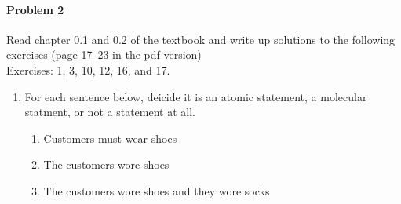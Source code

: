 \documentclass[11pt, a4paper]{article}
\begin{document}
\paragraph{Problem 2} Read chapter 0.1 and 0.2 of the textbook and write up solutions to the following exercises (page 17--23 in the pdf version)\\

Exercises: 1, 3, 10, 12, 16, and 17.\

\begin{enumerate}

    \item For each sentence below, deicide it is an atomic statement, a molecular statment, or not a statement at all.
        \begin{enumerate}
            \item Customers must wear shoes
            \item The customers wore shoes
            \item The customers wore shoes and they wore socks
        \end{enumerate}
    

\end{enumerate}
\end{document}
